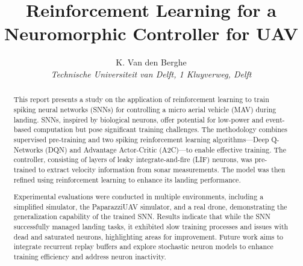 \documentclass{article}
\title{Reinforcement Learning for a Neuromorphic Controller for UAV}
\author{K. Van den Berghe\\ \textit{Technische Universiteit van Delft, 1 Kluyverweg, Delft}\vspace{-0.5cm}}
\begin{document}
\maketitle

\begin{abstract}
 This report presents a study on the application of reinforcement learning to train spiking neural networks (SNNs) for controlling a micro aerial vehicle (MAV) during landing. SNNs, inspired by biological neurons, offer potential for low-power and event-based computation but pose significant training challenges. The methodology combines supervised pre-training and two spiking reinforcement learning algorithms—Deep Q-Networks (DQN) and Advantage Actor-Critic (A2C)—to enable effective training. The controller, consisting of layers of leaky integrate-and-fire (LIF) neurons, was pre-trained to extract velocity information from sonar measurements. The model was then refined using reinforcement learning to enhance its landing performance.

Experimental evaluations were conducted in multiple environments, including a simplified simulator, the PaparazziUAV simulator, and a real drone, demonstrating the generalization capability of the trained SNN. Results indicate that while the SNN successfully managed landing tasks, it exhibited slow training processes and issues with dead and saturated neurons, highlighting areas for improvement. Future work aims to integrate recurrent replay buffers and explore stochastic neuron models to enhance training efficiency and address neuron inactivity.
\end{abstract}

















% 
\end{document}
